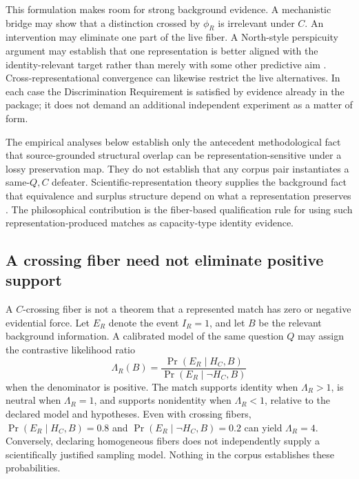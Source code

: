 \documentclass[11pt]{article}
\begin{document}
This formulation makes room for strong background evidence. A mechanistic bridge may show that a distinction crossed by \(\phi_R\) is irrelevant under \(C\). An intervention may eliminate one part of the live fiber. A North-style perspicuity argument may establish that one representation is better aligned with the identity-relevant target rather than merely with some other predictive aim \citep{North2026Perspicuous}. Cross-representational convergence can likewise restrict the live alternatives. In each case the Discrimination Requirement is satisfied by evidence already in the package; it does not demand an additional independent experiment as a matter of form.

The empirical analyses below establish only the antecedent methodological fact that source-grounded structural overlap can be representation-sensitive under a lossy preservation map. They do not establish that any corpus pair instantiates a same-\(Q,C\) defeater. Scientific-representation theory supplies the background fact that equivalence and surplus structure depend on what a representation preserves \citep{Nguyen2017RepresentationEquivalence,NguyenTehWells2020Surplus,FriggNguyen2020ModellingNature,NguyenFrigg2022ScientificRepresentation}. The philosophical contribution is the fiber-based qualification rule for using such representation-produced matches as capacity-type identity evidence.


\subsection{A crossing fiber need not eliminate positive support}

A \(C\)-crossing fiber is not a theorem that a represented match has zero or negative evidential force. Let \(E_R\) denote the event \(I_R=1\), and let \(B\) be the relevant background information. A calibrated model of the same question \(Q\) may assign the contrastive likelihood ratio
\begin{equation}
\Lambda_R(B)=
\frac{\Pr(E_R\mid H_C,B)}{\Pr(E_R\mid\neg H_C,B)}
\label{eq:m28-lr}
\end{equation}
when the denominator is positive. The match supports identity when \(\Lambda_R>1\), is neutral when \(\Lambda_R=1\), and supports nonidentity when \(\Lambda_R<1\), relative to the declared model and hypotheses. Even with crossing fibers, \(\Pr(E_R\mid H_C,B)=0.8\) and \(\Pr(E_R\mid\neg H_C,B)=0.2\) can yield \(\Lambda_R=4\). Conversely, declaring homogeneous fibers does not independently supply a scientifically justified sampling model. Nothing in the corpus establishes these probabilities.
\end{document}
